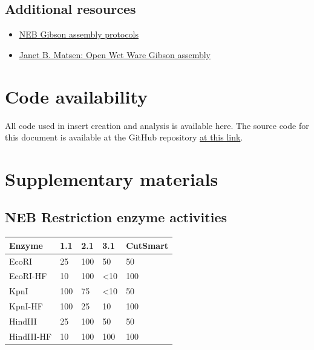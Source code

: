 \documentclass[11pt]{article}
\begin{document}
\subsection{Additional resources}

\begin{itemize}
	\item \href{https://www.neb.com/applications/cloning-and-synthetic-biology/dna-assembly-and-cloning/gibson-assembly}{NEB Gibson assembly protocols}
	\item \href{https://openwetware.org/wiki/Janet_B._Matsen:Guide_to_Gibson_Assembly}{Janet B. Matsen: Open Wet Ware Gibson assembly}
\end{itemize}


\section{Code availability}

All code used in insert creation and analysis is available here. The source code for this document is available at the GitHub repository \href{https://github.com/EthanHolleman/plasmid-VR-design}{at this link}.

\section{Supplementary materials}

\subsection{NEB Restriction enzyme activities}

\begin{table}[H]
	\centering
	\begin{tabular}{@{}lllll@{}}
		\toprule
		Enzyme     & 1.1 & 2.1 & 3.1           & CutSmart \\ \midrule
		EcoRI      & 25  & 100 & 50            & 50       \\
		EcoRI-HF   & 10  & 100 & \textless{}10 & 100      \\
		KpnI       & 100 & 75  & \textless{}10 & 50       \\
		KpnI-HF    & 100 & 25  & 10            & 100      \\
		HindIII    & 25  & 100 & 50            & 50       \\
		HindIII-HF & 10  & 100 & 100           & 100      \\ \bottomrule
	\end{tabular}
\end{table}
\end{document}
